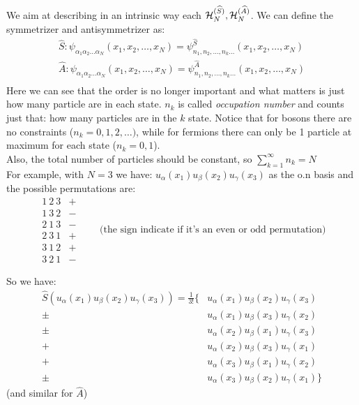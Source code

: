 We aim at describing in an intrinsic way each $\mathcal{H}_N^{(\widehat S)}, \mathcal{H}_N^{(\widehat A)}$.
We can define the symmetrizer and antisymmetrizer as:
\begin{align*}
    \widehat S : \psi_{\alpha_1\alpha_2\dots\alpha_N}(x_1,x_2,\dots,x_N) = \psi_{n_1,n_2,\dots, n_k \dots}^{\widehat S} (x_1, x_2, \dots, x_N) \\
    \widehat A : \psi_{\alpha_1\alpha_2\dots\alpha_N}(x_1,x_2,\dots,x_N) = \psi_{n_1,n_2,\dots, n_k \dots}^{\widehat A} (x_1, x_2, \dots, x_N) \\
\end{align*}
Here we can see that the order is no longer important and what matters is just how many particle are in each state. $n_k$ is called \textit{occupation number} and counts just that: how many particles are in the $k$ state. Notice that for bosons there are no constraints ($n_k = 0,1,2,\dots)$, while for fermions there can only be 1 particle at maximum for each state ($n_k = 0,1$).\\
Also, the total number of particles should be constant, so $\boxed{\sum_{k=1}^\infty n_k = N}$\\


    For example, with $N = 3$ we have: $u_\alpha(x_1) u_\beta(x_2) u_\gamma(x_3)$ as the o.n basis and the possible permutations are: 
    $$\begin{matrix}
        1 \ 2 \ 3 & + \\
        1 \ 3 \ 2 & - \\
        2 \ 1 \ 3 & - \\
        2 \ 3 \ 1 & + \\
        3 \ 1 \ 2 & + \\
        3 \ 2 \ 1 & -
    \end{matrix} \qquad \text{(the sign indicate if it's an even or odd permutation)}$$
    
    So we have: 
    \begin{align*}
        \widehat S\left(u_\alpha(x_1) u_\beta(x_2) u_\gamma(x_3)\right) = \frac1{3!} \bigg\{&u_\alpha(x_1) u_\beta(x_2) u_\gamma(x_3) \\
        \pm\  &u_\alpha(x_1) u_\beta(x_3) u_\gamma(x_2)\\
        \pm\ &u_\alpha(x_2) u_\beta(x_1) u_\gamma(x_3)\\
        +\ &u_\alpha(x_2) u_\beta(x_3) u_\gamma(x_1)\\
        +\ &u_\alpha(x_3) u_\beta(x_1) u_\gamma(x_2)\\
        \pm\ &u_\alpha(x_3) u_\beta(x_2) u_\gamma(x_1)  \bigg\}
    \end{align*}
    (and similar for $\widehat A$)
    
